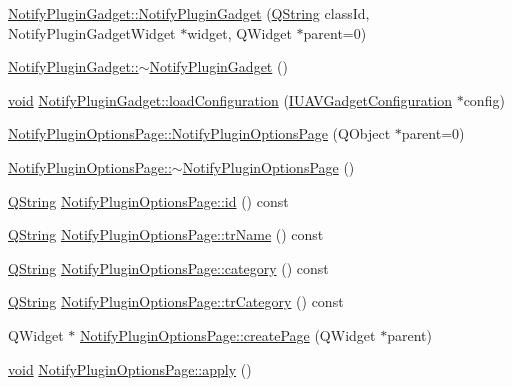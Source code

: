 \begin{DoxyCompactItemize}
\item 
\hyperlink{group___notify_plugin_ga2550c9c08be7f6731350a3be6fbaba4a}{\-Notify\-Plugin\-Gadget\-::\-Notify\-Plugin\-Gadget} (\hyperlink{group___u_a_v_objects_plugin_gab9d252f49c333c94a72f97ce3105a32d}{\-Q\-String} class\-Id, \-Notify\-Plugin\-Gadget\-Widget $\ast$widget, \-Q\-Widget $\ast$parent=0)
\item 
\hyperlink{group___notify_plugin_ga2b03f730db4ecb4673e46a323c9cbc45}{\-Notify\-Plugin\-Gadget\-::$\sim$\-Notify\-Plugin\-Gadget} ()
\item 
\hyperlink{group___u_a_v_objects_plugin_ga444cf2ff3f0ecbe028adce838d373f5c}{void} \hyperlink{group___notify_plugin_gad7b898c97fa3c65ea707934881f356e5}{\-Notify\-Plugin\-Gadget\-::load\-Configuration} (\hyperlink{class_core_1_1_i_u_a_v_gadget_configuration}{\-I\-U\-A\-V\-Gadget\-Configuration} $\ast$config)
\item 
\hyperlink{group___notify_plugin_gaf584594e769010fbcdb1feb54b94eaab}{\-Notify\-Plugin\-Options\-Page\-::\-Notify\-Plugin\-Options\-Page} (\-Q\-Object $\ast$parent=0)
\item 
\hyperlink{group___notify_plugin_ga3dfd084ec6b7b9f55aeb3a5c475b11d7}{\-Notify\-Plugin\-Options\-Page\-::$\sim$\-Notify\-Plugin\-Options\-Page} ()
\item 
\hyperlink{group___u_a_v_objects_plugin_gab9d252f49c333c94a72f97ce3105a32d}{\-Q\-String} \hyperlink{group___notify_plugin_ga9528eeaab32e5a6696eb4e82c7dda847}{\-Notify\-Plugin\-Options\-Page\-::id} () const 
\item 
\hyperlink{group___u_a_v_objects_plugin_gab9d252f49c333c94a72f97ce3105a32d}{\-Q\-String} \hyperlink{group___notify_plugin_ga156b37b99e34d9b0e865f57efaa55f3c}{\-Notify\-Plugin\-Options\-Page\-::tr\-Name} () const 
\item 
\hyperlink{group___u_a_v_objects_plugin_gab9d252f49c333c94a72f97ce3105a32d}{\-Q\-String} \hyperlink{group___notify_plugin_ga1a0c17416e10df677d14565330619cfb}{\-Notify\-Plugin\-Options\-Page\-::category} () const 
\item 
\hyperlink{group___u_a_v_objects_plugin_gab9d252f49c333c94a72f97ce3105a32d}{\-Q\-String} \hyperlink{group___notify_plugin_ga963ad76e88d1a3737bd5d12e493c214a}{\-Notify\-Plugin\-Options\-Page\-::tr\-Category} () const 
\item 
\-Q\-Widget $\ast$ \hyperlink{group___notify_plugin_gaab5b02bf851c75f0476a29cc59bde9ae}{\-Notify\-Plugin\-Options\-Page\-::create\-Page} (\-Q\-Widget $\ast$parent)
\item 
\hyperlink{group___u_a_v_objects_plugin_ga444cf2ff3f0ecbe028adce838d373f5c}{void} \hyperlink{group___notify_plugin_gae0ac041ae8505afd88f981a6ac235fe7}{\-Notify\-Plugin\-Options\-Page\-::apply} ()

\end{DoxyCompactItemize}

